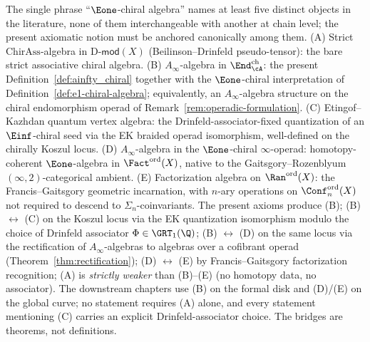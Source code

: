 \begin{remark}
\label{rem:axioms-five-e1-notions}%
%
The single phrase ``$\Eone$-chiral algebra'' names at least five
distinct objects in the literature, none of them interchangeable
with another at chain level; the present axiomatic notion must be
anchored canonically among them.
(A) Strict $\mathrm{ChirAss}$-algebra in $\mathrm{D}\text{-}\mathsf{mod}(X)$
(Beilinson--Drinfeld pseudo-tensor): the bare strict associative
chiral algebra.
(B) $A_\infty$-algebra in $\End^{\mathrm{ch}}_\cA$: the present
Definition~\ref{def:ainfty_chiral} together with the
$\Eone$-chiral interpretation of
Definition~\ref{def:e1-chiral-algebra}; equivalently, an
$A_\infty$-algebra structure on the chiral endomorphism operad
of Remark~\ref{rem:operadic-formulation}.
(C) Etingof--Kazhdan quantum vertex algebra: the Drinfeld-associator-fixed
quantization of an $\Einf$-chiral seed via the EK braided
operad isomorphism, well-defined on the chirally Koszul locus.
(D) $A_\infty$-algebra in the $\Eone$-chiral $\infty$-operad:
homotopy-coherent $\Eone$-algebra in $\Fact^{\mathrm{ord}}(X)$,
native to the Gaitsgory--Rozenblyum $(\infty,2)$-categorical
ambient.
(E) Factorization algebra on $\Ran^{\mathrm{ord}}(X)$: the
Francis--Gaitsgory geometric incarnation, with $n$-ary operations
on $\Conf_n^{\mathrm{ord}}(X)$ not required to descend to
$\Sigma_n$-coinvariants.
The present axioms produce (B);
(B) $\leftrightarrow$ (C) on the Koszul locus via the EK quantization
isomorphism modulo the choice of Drinfeld associator
$\Phi \in \GRT_1(\Q)$; (B) $\leftrightarrow$ (D) on the same
locus via the rectification of $A_\infty$-algebras to algebras
over a cofibrant operad (Theorem~\ref{thm:rectification});
(D) $\leftrightarrow$ (E) by Francis--Gaitsgory factorization
recognition; (A) is \emph{strictly weaker} than (B)--(E) (no
homotopy data, no associator). The downstream chapters use (B)
on the formal disk and (D)/(E) on the global curve; no statement
requires (A) alone, and every statement mentioning (C) carries
an explicit Drinfeld-associator choice. The bridges are theorems,
not definitions.
\end{remark}

